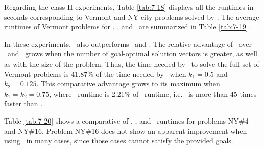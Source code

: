 Regarding the class II experiments, Table \ref{tab:7-18} displays all the runtimes in seconds corresponding to Vermont and NY city problems solved by \lexgote. The average runtimes of Vermont problems for \lexgolex, \lexgolin, and \lexgote \ are summarized in Table \ref{tab:7-19}. 

In these experiments, \lexgote \ also outperforms \lexgolex \ and \lexgolin. The relative advantage of \lexgote \ over \lexgolex \ and \lexgolin \ grows when the number of goal-optimal solution vectors is greater, as well as with the size of the problem. Thus, the time needed by \lexgote \ to solve the full set of Vermont problems is 41.87\% of the time needed by \lexgolex \ when $k_1 = 0.5$ and $k_2 = 0.125$. This comparative advantage grows to its maximum when $k_1 = k_2 = 0.75$, where \lexgote \ runtime is 2.21\% of \lexgolex \ runtime, i.e. \lexgote \ is more than 45 times faster than \lexgolex.

Table \ref{tab:7-20} shows a comparative of \lexgolex, \lexgolin, and \lexgote \ runtimes for problems NY\#4 and NY\#16. Problem NY\#16 does not show an apparent improvement when using \lexgote \ in many cases, since those cases cannot satisfy the provided goals. 

